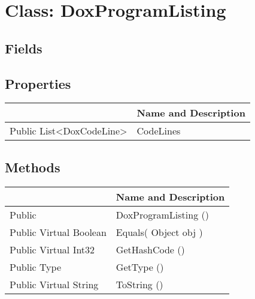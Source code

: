 \documentclass[11pt, oneside, a4paper]{book}
\begin{document}
\hypertarget{SoftwareEngineeringTools.{}Documentation.{}DoxProgramListing}{}
\section{Class: DoxProgramListing}

\subsection{Fields}

\subsection{Properties}
\begin{center}
\begin{tabular}{| p{3cm} | p{12cm} | }
\hline
\textbf{ } & \textbf{ Name and Description}\\
\hline
 Public  List<DoxCodeLine> &  CodeLines\hypertarget{SoftwareEngineeringTools.{}Documentation.{}DoxProgramListing.{}CodeLines}{}\\
\hline
\end{tabular}
\end{center}

\subsection{Methods}
\begin{center}
\begin{tabular}{| p{3cm} | p{12cm} | }
\hline
\textbf{ } & \textbf{ Name and Description}\\
\hline
 Public  &  DoxProgramListing ()\hypertarget{SoftwareEngineeringTools.{}Documentation.{}DoxProgramListing.{}DoxProgramListing}{}\\
\hline
 Public  Virtual  Boolean &  Equals(\hypertarget{SoftwareEngineeringTools.{}Documentation.{}DoxProgramListing.{}Equals\_Object}{} Object  obj  )\\
\hline
 Public  Virtual  Int32 &  GetHashCode ()\hypertarget{SoftwareEngineeringTools.{}Documentation.{}DoxProgramListing.{}GetHashCode}{}\\
\hline
 Public  Type &  GetType ()\hypertarget{SoftwareEngineeringTools.{}Documentation.{}DoxProgramListing.{}GetType}{}\\
\hline
 Public  Virtual  String &  ToString ()\hypertarget{SoftwareEngineeringTools.{}Documentation.{}DoxProgramListing.{}ToString}{}\\
\hline
\end{tabular}
\end{center}
 
\end{document}
